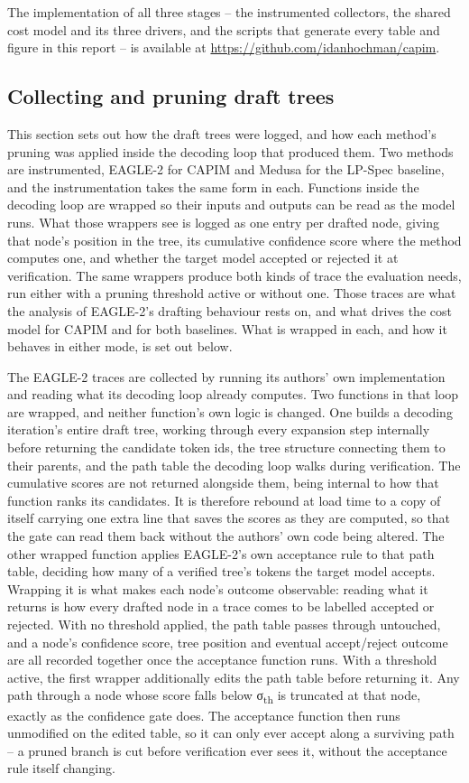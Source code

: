 \documentclass[11pt]{article}
\begin{document}
The implementation of all three stages -- the instrumented collectors, the shared cost model and its three drivers, and the scripts that generate every table and figure in this report -- is available at \url{https://github.com/idanhochman/capim}.

\subsection{Collecting and pruning draft trees}
\label{sec:characterization}
This section sets out how the draft trees were logged, and how each method's pruning was applied inside the decoding loop that produced them. Two methods are instrumented, EAGLE-2 for CAPIM and Medusa for the LP-Spec baseline, and the instrumentation takes the same form in each. Functions inside the decoding loop are wrapped so their inputs and outputs can be read as the model runs. What those wrappers see is logged as one entry per drafted node, giving that node's position in the tree, its cumulative confidence score where the method computes one, and whether the target model accepted or rejected it at verification. The same wrappers produce both kinds of trace the evaluation needs, run either with a pruning threshold active or without one. Those traces are what the analysis of EAGLE-2's drafting behaviour rests on, and what drives the cost model for CAPIM and for both baselines. What is wrapped in each, and how it behaves in either mode, is set out below.

The EAGLE-2 traces are collected by running its authors' own implementation and reading what its decoding loop already computes. Two functions in that loop are wrapped, and neither function's own logic is changed. One builds a decoding iteration's entire draft tree, working through every expansion step internally before returning the candidate token ids, the tree structure connecting them to their parents, and the path table the decoding loop walks during verification. The cumulative scores are not returned alongside them, being internal to how that function ranks its candidates. It is therefore rebound at load time to a copy of itself carrying one extra line that saves the scores as they are computed, so that the gate can read them back without the authors' own code being altered. The other wrapped function applies EAGLE-2's own acceptance rule to that path table, deciding how many of a verified tree's tokens the target model accepts. Wrapping it is what makes each node's outcome observable: reading what it returns is how every drafted node in a trace comes to be labelled accepted or rejected. With no threshold applied, the path table passes through untouched, and a node's confidence score, tree position and eventual accept/reject outcome are all recorded together once the acceptance function runs. With a threshold active, the first wrapper additionally edits the path table before returning it. Any path through a node whose score falls below σ\textsubscript{th} is truncated at that node, exactly as the confidence gate does. The acceptance function then runs unmodified on the edited table, so it can only ever accept along a surviving path -- a pruned branch is cut before verification ever sees it, without the acceptance rule itself changing.
\end{document}
